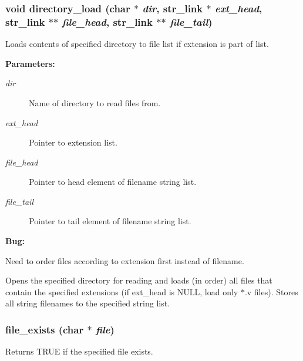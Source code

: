 \subsubsection{\setlength{\rightskip}{0pt plus 5cm}void directory\_\-load (char $\ast$ {\em dir}, {\bf str\_\-link} $\ast$ {\em ext\_\-head}, {\bf str\_\-link} $\ast$$\ast$ {\em file\_\-head}, {\bf str\_\-link} $\ast$$\ast$ {\em file\_\-tail})}\label{util_8c_a11}


Loads contents of specified directory to file list if extension is part of list.

\begin{Desc}
\item[{\bf Parameters: }]\par
\begin{description}
\item[
{\em dir}]Name of directory to read files from. \item[
{\em ext\_\-head}]Pointer to extension list. \item[
{\em file\_\-head}]Pointer to head element of filename string list. \item[
{\em file\_\-tail}]Pointer to tail element of filename string list.

\end{description}
\end{Desc}


\begin{Desc}
\item[{\bf {\bf Bug: }}]\par
Need to order files according to extension first instead of filename.\end{Desc}


Opens the specified directory for reading and loads (in order) all files that contain the specified extensions (if ext\_\-head is NULL, load only $\ast$.v files). Stores all string filenames to the specified string list. 
\subsubsection{ file\_\-exists (char $\ast$ {\em file})}\label{util_8c_a12}


Returns TRUE if the specified file exists.

